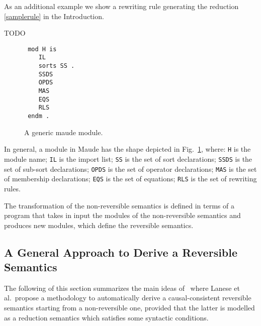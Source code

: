 \documentclass{article}[12pt,a4paper]
\theoremstyle{definition}
\begin{document}
As an additional example we show a rewriting rule generating the reduction \ref{samplerule} in the Introduction.

TODO


\begin{figure}[t]
\begin{verbatim}
 mod H is
    IL
    sorts SS .
    SSDS
    OPDS
    MAS
    EQS
    RLS
 endm .
\end{verbatim}
  
  \caption{A generic maude module.}
  \label{fig:maude-module}
\end{figure}

In general, a module in Maude has the shape depicted in Fig.~\ref{fig:maude-module}, where:
\verb+H+ is the module name; \verb+IL+ is the import list; \verb+SS+ is the set
of sort declarations; \verb+SSDS+ is the set of sub-sort declarations; \verb+OPDS+
is the set of operator declarations; \verb+MAS+ is the set of membership
declarations; \verb+EQS+ is the set of equations; \verb+RLS+ is the set of
rewriting rules. 

The transformation of the non-reversible semantics is defined in terms of a
program that takes in input the modules of the non-reversible semantics and
produces new modules, which define the reversible semantics.


\subsection{A General Approach to Derive a Reversible Semantics}\label{sec:gener-appr-derive-rev-sem}


The following of this section summarizes the main ideas of~\cite{LaneseM20}
where Lanese et al.\ propose a methodology to automatically
derive a causal-consistent reversible semantics starting from a non-reversible one, provided that
the latter is modelled as a reduction semantics which satisfies some syntactic conditions.
\end{document}
